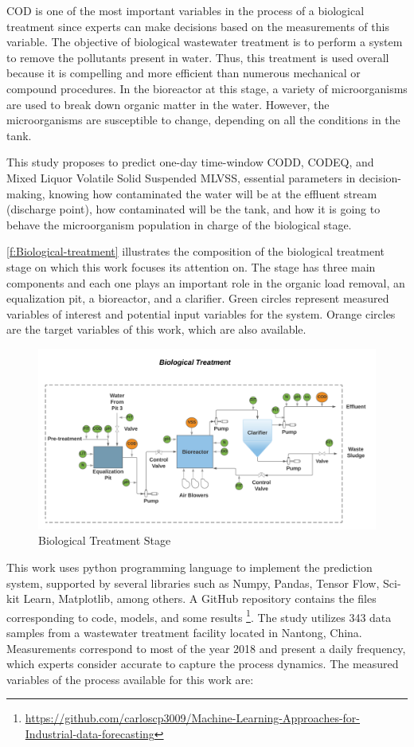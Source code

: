 COD is one of the most important variables in the process of a biological treatment since experts can make decisions based on the measurements of this variable. The objective of biological wastewater treatment is to perform a system to remove the pollutants present in water. Thus, this treatment is used overall because it is compelling and more efficient than numerous mechanical or compound procedures. In the bioreactor at this stage, a variety of microorganisms are used to break down organic matter in the water. However, the microorganisms are susceptible to change, depending on all the conditions in the tank.

This study proposes to predict one-day time-window CODD, CODEQ, and Mixed Liquor Volatile Solid Suspended MLVSS, essential parameters in decision-making, knowing how contaminated the water will be at the effluent stream (discharge point), how contaminated will be the tank, and how it is going to behave the microorganism population in charge of the biological stage. 

\autoref{f:Biological-treatment} illustrates the composition of the biological treatment stage on which this work focuses its attention on. The stage has three main components and each one plays an important role in the organic load removal, an equalization pit, a bioreactor, and a clarifier. Green circles represent measured variables of interest and potential input variables for the system. Orange circles are the target variables of this work, which are also available.

\begin{figure}[h]
\centering
\includegraphics[width=\linewidth]{figures/Ch4/Biological-treatment-stage.png}
\caption{Biological Treatment Stage}
\label{f:Biological-treatment}
\end{figure}

This work uses python programming language to implement the prediction system, supported by several libraries such as Numpy, Pandas, Tensor Flow, Sci-kit Learn, Matplotlib, among others. A GitHub repository contains the files corresponding to code, models, and some results \footnote{\url{https://github.com/carloscp3009/Machine-Learning-Approaches-for-Industrial-data-forecasting}}. The study utilizes 343 data samples from a wastewater treatment facility located in Nantong, China. Measurements correspond to most of the year 2018 and present a daily frequency, which experts consider accurate to capture the process dynamics. The measured variables of the process available for this work are:

